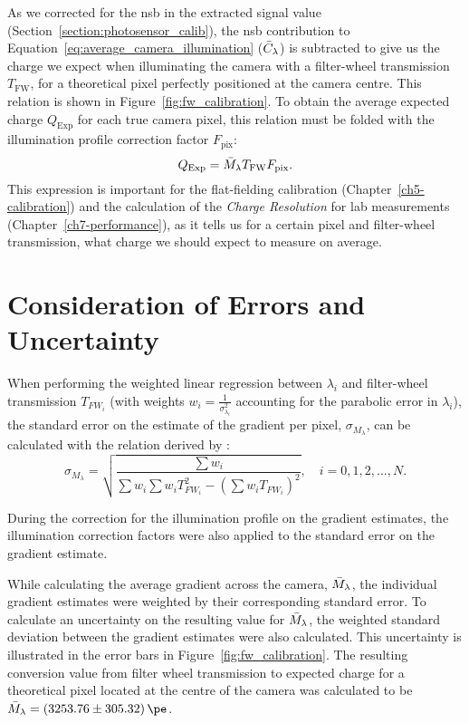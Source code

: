 As we corrected for the \gls{nsb} in the extracted signal value (Section~\ref{section:photosensor_calib}), the \gls{nsb} contribution to Equation~\ref{eq:average_camera_illumination} ($\bar{C}_\lambda$) is subtracted to give us the charge we expect when illuminating the camera with a filter-wheel transmission $T_\text{FW}$, for a theoretical pixel perfectly positioned at the camera centre. This relation is shown in Figure~\ref{fig:fw_calibration}. To obtain the average expected charge $Q_\text{Exp}$ for each true camera pixel, this relation must be folded with the illumination profile correction factor $F_\text{pix}$:
\begin{equation} \label{eq:average_expected_charge}
Q_\text{Exp} = \bar{M}_\lambda T_\text{FW}F_\text{pix}.
\end{equation}
This expression is important for the flat-fielding calibration (Chapter~\ref{ch5-calibration}) and the calculation of the \textit{Charge Resolution} for lab measurements (Chapter~\ref{ch7-performance}), as it tells us for a certain pixel and filter-wheel transmission, what charge we should expect to measure on average.

\section{Consideration of Errors and Uncertainty} \label{section:fwerr}

When performing the weighted linear regression between $\lambda_i$ and filter-wheel transmission $T_{FW_i}$ (with weights $w_i = \frac{1}{\sigma_{\lambda_i}^2}$ accounting for the parabolic error in $\lambda_i$), the standard error on the estimate of the gradient per pixel, $\sigma_{M_\lambda}$, can be calculated with the relation derived by \textcite{Taylor1997}:
\begin{equation} \label{eq:wmerr}
\sigma_{M_\lambda} = \sqrt{\frac{\sum w_i}{\sum w_i \sum w_i T_{FW_i}^2 - (\sum w_i T_{FW_i})^2}}, \quad i = 0, 1, 2, ..., N.
\end{equation}

During the correction for the illumination profile on the gradient estimates, the illumination correction factors were also applied to the standard error on the gradient estimate.

While calculating the average gradient across the camera, $\bar{M}_\lambda$, the individual gradient estimates were weighted by their corresponding standard error. To calculate an uncertainty on the resulting value for $\bar{M}_\lambda$, the weighted standard deviation between the gradient estimates were also calculated. This uncertainty is illustrated in the error bars in Figure~\ref{fig:fw_calibration}. The resulting conversion value from filter wheel transmission to expected charge for a theoretical pixel located at the centre of the camera was calculated to be $\average{M}_\lambda = \SI[separate-uncertainty = true]{3253.76 \pm 305.32}{\pe}$.